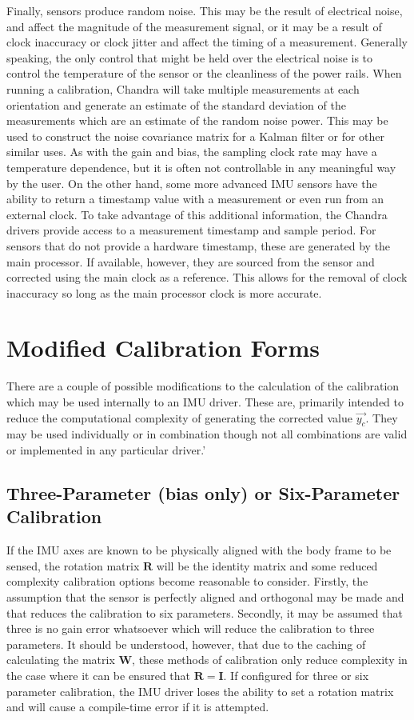 \documentclass[10pt,letterpaper]{memoir} %
\begin{document}
Finally, sensors produce random noise.  This may be the result of electrical noise, and affect the magnitude of the measurement signal, or it may be a result of clock inaccuracy or clock jitter and affect the timing of a measurement.  Generally speaking, the only control that might be held over the electrical noise is to control the temperature of the sensor or the cleanliness of the power rails.  When running a calibration, Chandra will take multiple measurements at each orientation and generate an estimate of the standard deviation of the measurements which are an estimate of the random noise power.  This may be used to construct the noise covariance matrix for a Kalman filter or for other similar uses.  As with the gain and bias, the sampling clock rate may have a temperature dependence, but it is often not controllable in any meaningful way by the user.  On the other hand, some more advanced IMU sensors have the ability to return a timestamp value with a measurement or even run from an external clock.  To take advantage of this additional information, the Chandra drivers provide access to a measurement timestamp and sample period.  For sensors that do not provide a hardware timestamp, these are generated by the main processor.  If available, however, they are sourced from the sensor and corrected using the main clock as a reference.  This allows for the removal of clock inaccuracy so long as the main processor clock is more accurate.


\section{Modified Calibration Forms}
There are a couple of possible modifications to the calculation of the calibration which may be used internally to an IMU driver.  These are, primarily intended to reduce the computational complexity of generating the corrected value $\vec{y_c}$.  They may be used individually or in combination though not all combinations are valid or implemented in any particular driver.'


   
\subsection{Three-Parameter (bias only) or Six-Parameter Calibration}
If the IMU axes are known to be physically aligned with the body frame to be sensed, the rotation matrix $\mathbf{R}$ will be the identity matrix and some reduced complexity calibration options become reasonable to consider.  Firstly, the assumption that the sensor is perfectly aligned and orthogonal may be made and that reduces the calibration to six parameters.  Secondly, it may be assumed that three is no gain error whatsoever which will reduce the calibration to three parameters.  It should be understood, however, that due to the caching of calculating the matrix $\mathbf{W}$, these methods of calibration only reduce complexity in the case where it can be ensured that $\mathbf{R} = \mathbf{I}$.  If configured for three or six parameter calibration, the IMU driver loses the ability to set a rotation matrix and will cause a compile-time error if it is attempted.
\end{document}
